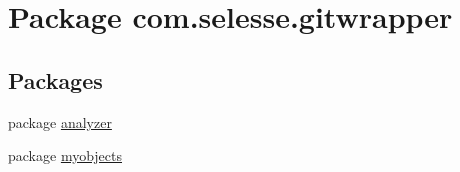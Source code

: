 \hypertarget{namespacecom_1_1selesse_1_1gitwrapper}{}\section{Package com.\+selesse.\+gitwrapper}
\label{namespacecom_1_1selesse_1_1gitwrapper}
\subsection*{Packages}
\begin{DoxyCompactItemize}
\item 
package \hyperlink{namespacecom_1_1selesse_1_1gitwrapper_1_1analyzer}{analyzer}
\item 
package \hyperlink{namespacecom_1_1selesse_1_1gitwrapper_1_1myobjects}{myobjects}
\end{DoxyCompactItemize}

